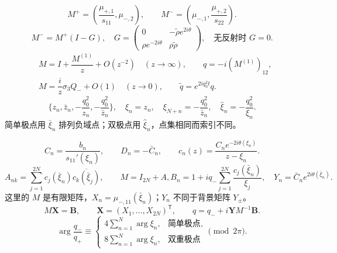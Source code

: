 \documentclass[lang=cn,scheme=chinese,mode=simple,device=normal,color=blue,
math=cm,thmcnt=section,12pt]{elegantbook}
\newcommand{\conj}[1]{\overline{#1}}
\begin{document}
\[
    M^+=\left(\dfrac{\mu_{+,1}}{s_{11}},\mu_{-,2}\right),\qquad
    M^-=\left(\mu_{-,1},\dfrac{\mu_{+,2}}{s_{22}}\right).
\]
\[
    M^-=M^+(I-G),\quad G=\begin{pmatrix}0                  & -\widetilde\rho e^{2i\theta} \\
               \rho e^{-2i\theta} & \rho\widetilde\rho\end{pmatrix},\quad\text{无反射时 }G=0.
\]
\[
    \begin{aligned}
         & M=I+\dfrac{M^{(1)}}{z}+O(z^{-2})\quad(z\to\infty),\qquad q=-i(M^{(1)})_{12}, \\
         & M=\dfrac{i}{z}\sigma_3Q_-+O(1)\quad(z\to0),\qquad\widetilde q=e^{2iq_0^2t}q.
    \end{aligned}
\]
\[
    \{z_n,\bar z_n,-\dfrac{q_0^2}{z_n},-\dfrac{q_0^2}{\bar z_n}\},\quad
    \xi_n=z_n,\quad\xi_{N+n}=-\dfrac{q_0^2}{\bar z_n},\quad\widehat\xi_n=-\dfrac{q_0^2}{\xi_n}.
\]
简单极点用 $\bar\xi_n$ 排列负域点；双极点用 $\widehat\xi_n$，点集相同而索引不同。

\[
    C_n=\dfrac{b_n}{s_{11}'(\xi_n)},\qquad D_n=-\bar C_n,\qquad
    c_n(z)=\dfrac{C_ne^{-2i\theta(\xi_n)}}{z-\xi_n}.
\]
\[
    A_{nk}=\sum\limits_{j=1}^{2N}c_j(\bar\xi_n)\conj{c_k(\bar\xi_j)},\qquad M=I_{2N}+A,
    B_n=1+iq_-\sum\limits_{j=1}^{2N}\dfrac{c_j(\bar\xi_n)}{\xi_j},\quad
    Y_n=\bar C_ne^{2i\theta(\bar\xi_n)}.
\]
这里的 $M$ 是有限矩阵，$X_n=\mu_{-,11}(\bar\xi_n)$；$Y_n$ 不同于背景矩阵 $Y_\pm$。
\[
    M\boldsymbol X=\boldsymbol B,\qquad
    \boldsymbol X=(X_1,\ldots,X_{2N})^{\mathsf T},\qquad
    q=q_-+i\boldsymbol YM^{-1}\boldsymbol B.
\]
\[
    \arg\dfrac{q_-}{q_+}\equiv
    \begin{cases}
        4\displaystyle\sum\limits_{n=1}^N\arg\xi_n, & \text{简单极点}, \\
        8\displaystyle\sum\limits_{n=1}^N\arg\xi_n, & \text{双重极点}
    \end{cases}\pmod{2\pi}.
\]
\end{document}
